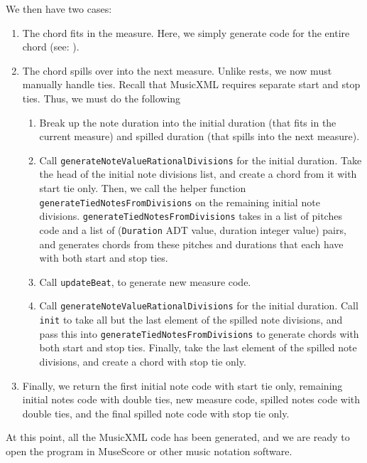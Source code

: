 \documentclass{report}
\begin{document}
We then have two cases:
\begin{enumerate}
\item The chord fits in the measure. Here, we simply generate code for the entire chord (see: ).

\item The chord spills  over into the  next measure. Unlike rests, we now must manually handle ties. Recall that MusicXML requires separate start and stop ties. Thus, we must do the following
\begin{enumerate}
\item Break up the note duration into the initial duration (that fits in the current measure) and spilled duration (that spills into the next measure). 

\item Call \verb.generateNoteValueRationalDivisions. for the initial duration. Take the head of the initial note divisions list, and create a chord from it with start tie only. Then, we call the helper function \verb.generateTiedNotesFromDivisions. on the remaining initial note divisions. \verb.generateTiedNotesFromDivisions. takes in a list of pitches code and a list of (\verb.Duration. ADT value, duration integer value) pairs, and generates chords from these pitches and durations that each have with both start and stop ties.

\item Call \verb.updateBeat., to generate new measure code. 

\item Call \verb.generateNoteValueRationalDivisions. for the initial duration. Call \verb.init. to take all but the last element of the spilled note divisions, and pass this into \verb.generateTiedNotesFromDivisions. to generate chords with both start and stop ties. Finally, take the last element of the spilled note divisions, and create a chord with stop tie only.
\end{enumerate}

\item Finally, we return the first initial note code with start tie only, remaining initial notes code with double ties, new measure code,  spilled notes code with double ties, and the final spilled note code with stop tie only.
\end{enumerate}



At this point, all the MusicXML code has been generated, and we are ready to open the program in MuseScore or other music notation software.
\end{document}
